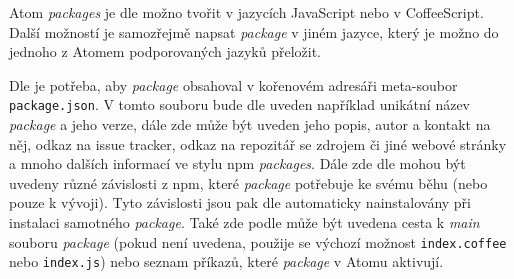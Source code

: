 Atom \textit{packages} je dle \cite{atom-docs} možno tvořit v jazycích JavaScript nebo v CoffeeScript. Další možností je
samozřejmě napsat \textit{package} v jiném jazyce, který je možno do jednoho z Atomem podporovaných jazyků přeložit.

Dle \cite{atom-docs} je potřeba, aby \textit{package} obsahoval v kořenovém adresáři meta-soubor \texttt
{package.json}. V tomto souboru bude dle \cite{atom-docs} uveden například unikátní název \textit{package} a jeho verze,
dále zde může být uveden jeho popis, autor a kontakt na něj, odkaz na issue tracker, odkaz na repozitář se zdrojem či
jiné webové stránky a mnoho dalších informací ve stylu npm \textit{packages}. Dále zde dle \cite{atom-docs} mohou být
uvedeny různé závislosti z npm, které \textit{package} potřebuje ke svému běhu (nebo pouze k vývoji). Tyto závislosti
jsou pak dle \cite{atom-docs} automaticky nainstalovány při instalaci samotného \textit{package}. Také zde podle \cite
{atom-docs} může být uvedena cesta k \textit{main} souboru \textit{package} (pokud není uvedena, použije se výchozí
možnost \texttt{index.coffee} nebo \texttt{index.js}) nebo seznam příkazů, které \textit{package} v
Atomu aktivují.

